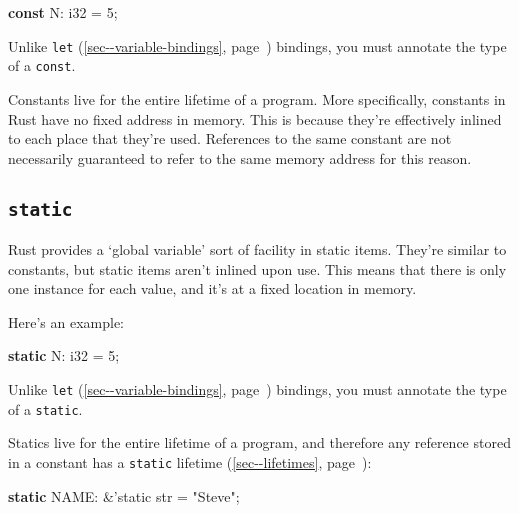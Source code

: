 \documentclass[a4paper,]{book}
\renewcommand*{\hyperlink}[2]{%
 #2 (\autoref{#1}, page~\pageref{#1})}
\newenvironment{Shaded}{\begin{snugshade}}{\end{snugshade}}
\newcommand{\KeywordTok}[1]{\textcolor[rgb]{0.13,0.29,0.53}{\textbf{{#1}}}}
\newcommand{\DataTypeTok}[1]{\textcolor[rgb]{0.13,0.29,0.53}{{#1}}}
\newcommand{\DecValTok}[1]{\textcolor[rgb]{0.00,0.00,0.81}{{#1}}}
\newcommand{\StringTok}[1]{\textcolor[rgb]{0.31,0.60,0.02}{{#1}}}
\newcommand{\OtherTok}[1]{\textcolor[rgb]{0.56,0.35,0.01}{{#1}}}
\newcommand{\NormalTok}[1]{{#1}}
\begin{document}
\begin{Shaded}
\begin{Highlighting}[]
\KeywordTok{const} \NormalTok{N: }\DataTypeTok{i32} \NormalTok{= }\DecValTok{5}\NormalTok{;}
\end{Highlighting}
\end{Shaded}

Unlike \protect\hyperlink{sec--variable-bindings}{\texttt{let}}
bindings, you must annotate the type of a \texttt{const}.

Constants live for the entire lifetime of a program. More specifically,
constants in Rust have no fixed address in memory. This is because
they're effectively inlined to each place that they're used. References
to the same constant are not necessarily guaranteed to refer to the same
memory address for this reason.

\subsection{\texorpdfstring{\texttt{static}}{static}}\label{static-1}

Rust provides a `global variable' sort of facility in static items.
They're similar to constants, but static items aren't inlined upon use.
This means that there is only one instance for each value, and it's at a
fixed location in memory.

Here's an example:

\begin{Shaded}
\begin{Highlighting}[]
\KeywordTok{static} \NormalTok{N: }\DataTypeTok{i32} \NormalTok{= }\DecValTok{5}\NormalTok{;}
\end{Highlighting}
\end{Shaded}

Unlike \protect\hyperlink{sec--variable-bindings}{\texttt{let}}
bindings, you must annotate the type of a \texttt{static}.

Statics live for the entire lifetime of a program, and therefore any
reference stored in a constant has a
\protect\hyperlink{sec--lifetimes}{\texttt{\textquotesingle{}static}
lifetime}:

\begin{Shaded}
\begin{Highlighting}[]
\KeywordTok{static} \NormalTok{NAME: &}\OtherTok{'static} \DataTypeTok{str} \NormalTok{= }\StringTok{"Steve"}\NormalTok{;}
\end{Highlighting}
\end{Shaded}
\end{document}
